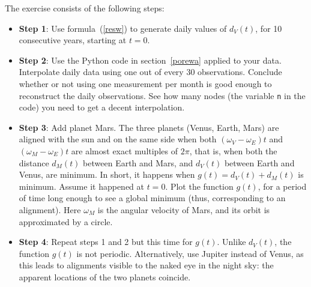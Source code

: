 \documentclass[oneside,10pt]{book}
\begin{document}
\begin{Exercise}
\noindent The exercise consists of the following steps:
\begin{itemize}
\item[] {\bf Step 1}:  Use formula~(\ref{resw}) to generate daily values of $d_V(t)$, for 10 consecutive years, starting at $t=0$.
\item[] {\bf Step 2}:  Use the Python code in section~\ref{porewa} applied to your data. Interpolate daily data using one out of every 30 observations. Conclude whether or not using one measurement per month is good enough to reconstruct the daily observations. See how many nodes (the variable \texttt{n} in the code) you need to get a decent interpolation.
\item[] {\bf Step 3}:  Add planet Mars. The three planets (Venus, Earth, Mars) are aligned with the sun and on the same side when both $(\omega_V-\omega_E)t$ and $(\omega_M-\omega_E)t$ are almost exact multiples of $2\pi$, that is, when both the distance $d_M(t)$ between Earth and Mars, and $d_V(t)$ between Earth and Venus, are minimum. In short, it happens when 
$g(t) = d_V(t) + d_M(t)$ is minimum.  Assume it happened at $t=0$. Plot the function $g(t)$, for a period of time long enough to see a global minimum (thus, corresponding to an alignment). Here $\omega_M$ is the angular velocity of Mars, and its orbit is approximated by a circle.
\item[] {\bf Step 4}: Repeat steps 1 and 2 but this time for $g(t)$. Unlike $d_V(t)$, the function $g(t)$ is not periodic. Alternatively, use Jupiter instead of Venus, as this leads to alignments visible to the naked eye in the night sky: the apparent locations of the two planets coincide. 


\end{itemize}
\end{Exercise}
\end{document}
